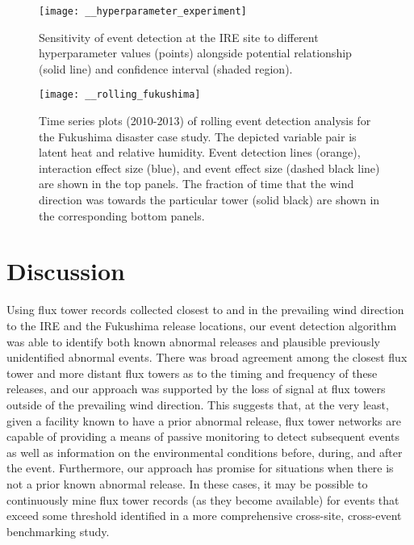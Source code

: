 \documentclass{article}
\begin{document}
\begin{figure}
	\centering
	\texttt{[image: \_\_hyperparameter\_experiment]}
	\caption{Sensitivity of event detection at the IRE site to different hyperparameter values (points) alongside potential relationship (solid line) and confidence interval (shaded region).}
	\label{fig:hyperparameter}
\end{figure}

\begin{figure}
	\centering
	\texttt{[image: \_\_rolling\_fukushima]}
	\caption{Time series plots (2010-2013) of rolling event detection analysis for the Fukushima disaster case study. The depicted variable pair is latent heat and relative humidity. Event detection lines (orange), interaction effect size (blue), and event effect size (dashed black line) are shown in the top panels. The fraction of time that the wind direction was towards the particular tower (solid black) are shown in the corresponding bottom panels.}
	\label{fig:fukushima}
\end{figure}

\section{Discussion}
Using flux tower records collected closest to and in the prevailing wind direction to the IRE and the Fukushima release locations, our event detection algorithm was able to identify both known abnormal releases and plausible previously unidentified abnormal events. There was broad agreement among the closest flux tower and more distant flux towers as to the timing and frequency of these releases, and our approach was supported by the loss of signal at flux towers outside of the prevailing wind direction. This suggests that, at the very least, given a facility known to have a prior abnormal release, flux tower networks are capable of providing a means of passive monitoring to detect subsequent events as well as information on the environmental conditions before, during, and after the event. Furthermore, our approach has promise for situations when there is not a prior known abnormal release. In these cases, it may be possible to continuously mine flux tower records (as they become available) for events that exceed some threshold identified in a more comprehensive cross-site, cross-event benchmarking study.
\end{document}
